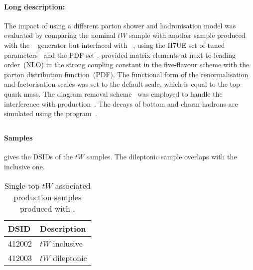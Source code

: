 \paragraph{Long description:}

The impact of using a different parton shower and hadronisation model was evaluated
by comparing the nominal \(tW\) sample with another sample produced with the
\POWHEGBOX[v2]~\cite{Re:2010bp,Nason:2004rx,Frixione:2007vw,Alioli:2010xd}
generator but interfaced with \HERWIG[7.04]~\cite{Bahr:2008pv,Bellm:2015jjp},
using the H7UE set of tuned parameters~\cite{Bellm:2015jjp} and the
\MMHT[lo] PDF set \cite{Harland-Lang:2014zoa}.
\POWHEGBOX provided matrix elements at next-to-leading order~(NLO) in the
strong coupling constant \alphas in the five-flavour scheme with the
\NNPDF[3.0nlo]~\cite{Ball:2014uwa} parton distribution function~(PDF).
The functional form of the renormalisation and factorisation scales was set to
the default scale, which is equal to the top-quark mass.  The diagram removal
scheme~\cite{Frixione:2008yi} was employed to handle the interference
with \ttbar production~\cite{ATL-PHYS-PUB-2016-020}.  The decays of bottom
and charm hadrons are simulated using the \EVTGEN[1.6.0]
program~\cite{Lange:2001uf}.


\subsection[MadGraph5\_aMC@NLO+Pythia8]{\MGNLOPY[8]}
\label{subsubsec:tW_aMCP8}

\paragraph{Samples}

 gives the DSIDs of the \(tW\) \MGNLOPY[8] samples.
The dileptonic sample overlaps with the inclusive one.

\begin{table}[htbp]
  \caption{Single-top \(tW\) associated production samples produced with \MGNLOPY[8].}%
  \label{tab:tW_aMCP8}
  \centering
  \begin{tabular}{l l}
    \toprule
    DSID & Description \\
    \midrule
    412002 & \(tW\) inclusive \\
    412003 & \(tW\) dileptonic \\
    \bottomrule
  \end{tabular}
\end{table}

